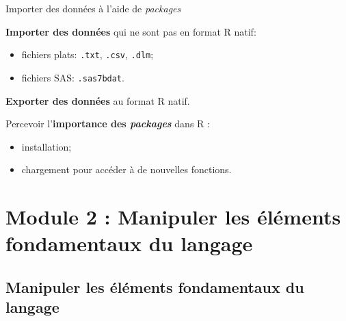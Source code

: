 \documentclass[12pt,ignorenonframetext,]{beamer}
\providecommand{\tightlist}{%
  \setlength{\itemsep}{0pt}\setlength{\parskip}{0pt}}
\begin{document}
\begin{frame}[fragile]{Importer des données à l’aide de \emph{packages}}
\protect\hypertarget{importer-des-donnees-a-laide-de-packages}{}

\textbf{Importer des données} qui ne sont pas en format R natif:

\begin{itemize}
\tightlist
\item
  fichiers plats: \texttt{.txt}, \texttt{.csv}, \texttt{.dlm};
\item
  fichiers SAS: \texttt{.sas7bdat}.
\end{itemize}

\bigskip \pause \textbf{Exporter des données} au format R natif.

\bigskip \pause Percevoir l’\textbf{importance des \emph{packages}} dans
R :

\begin{itemize}
\tightlist
\item
  installation;
\item
  chargement pour accéder à de nouvelles fonctions.
\end{itemize}

\end{frame}

\hypertarget{module-2-manipuler-les-elements-fondamentaux-du-langage}{%
\section{Module 2 : Manipuler les éléments fondamentaux du
langage}\label{module-2-manipuler-les-elements-fondamentaux-du-langage}}

\hypertarget{manipuler-les-elements-fondamentaux-du-langage}{%
\subsection*{Manipuler les éléments fondamentaux du
langage}\label{manipuler-les-elements-fondamentaux-du-langage}}
\end{document}
